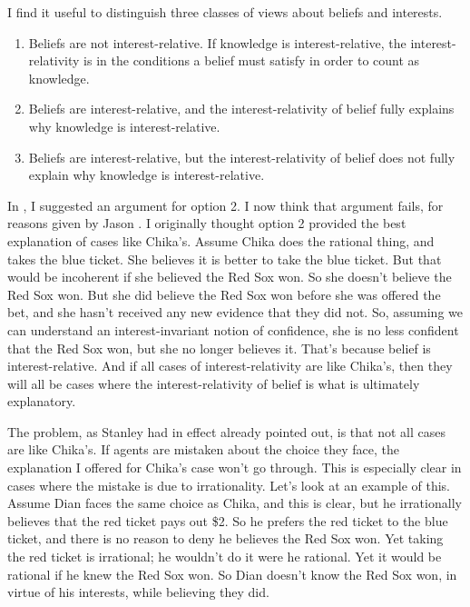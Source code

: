 I find it useful to distinguish three classes of views about beliefs and interests.

\begin{enumerate}
\item Beliefs are not interest-relative. If knowledge is interest-relative, the interest-relativity is in the conditions a belief must satisfy in order to count as knowledge.

\item Beliefs are interest-relative, and the interest-relativity of belief fully explains why knowledge is interest-relative.

\item Beliefs are interest-relative, but the interest-relativity of belief does not fully explain why knowledge is interest-relative.

\end{enumerate}
In  \citet{Weatherson2005}, I suggested an argument for option 2. I now think that argument fails, for reasons given by Jason  \citet{Stanley2005}. I originally thought option 2 provided the best explanation of cases like Chika's. Assume Chika does the rational thing, and takes the blue ticket. She believes it is better to take the blue ticket. But that would be incoherent if she believed the Red Sox won. So she doesn't believe the Red Sox won. But she did believe the Red Sox won before she was offered the bet, and she hasn't received any new evidence that they did not. So, assuming we can understand an interest-invariant notion of confidence, she is no less confident that the Red Sox won, but she no longer believes it. That's because belief is interest-relative. And if all cases of interest-relativity are like Chika's, then they will all be cases where the interest-relativity of belief is what is ultimately explanatory.

The problem, as Stanley had in effect already pointed out, is that not all cases are like Chika's. If agents are mistaken about the choice they face, the explanation I offered for Chika's case won't go through. This is especially clear in cases where the mistake is due to irrationality. Let's look at an example of this. Assume Dian faces the same choice as Chika, and this is clear, but he irrationally believes that the red ticket pays out \$2. So he prefers the red ticket to the blue ticket, and there is no reason to deny he believes the Red Sox won. Yet taking the red ticket is irrational; he wouldn't do it were he rational. Yet it would be rational if he knew the Red Sox won. So Dian doesn't know the Red Sox won, in virtue of his interests, while believing they did.

